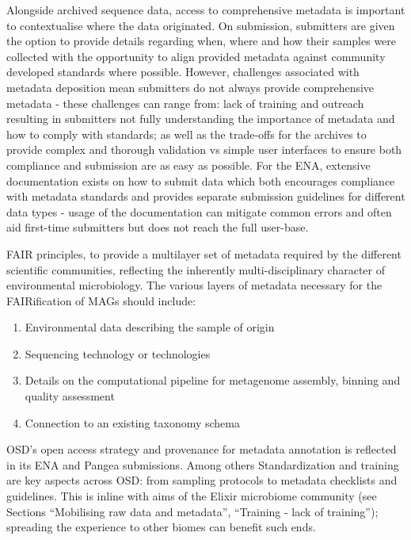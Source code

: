    Alongside archived sequence data, access to comprehensive metadata is important to contextualise where the data originated. 
   On submission, submitters are given the option to provide details regarding when, where and how their samples were collected with the opportunity to align provided metadata against community developed standards where possible. 
   However, challenges associated with metadata deposition mean submitters do not always provide comprehensive metadata - these challenges can range from: 
   lack of training and outreach resulting in submitters not fully understanding the importance of metadata and how to comply with standards; 
   as well as the trade-offs for the archives to provide complex and thorough validation vs simple user interfaces to ensure both compliance and submission are as easy as possible. 
   For the ENA, extensive documentation exists on how to submit data which both encourages compliance with metadata standards and provides separate submission guidelines for different data types - usage of the documentation can mitigate common errors and often aid first-time submitters but does not reach the full user-base. 

   FAIR principles, to provide a multilayer set of metadata required by the different scientific communities, reflecting the inherently multi-disciplinary character of environmental microbiology. 
   The various layers of metadata necessary for the FAIRification of MAGs should include:
   \begin{enumerate}
      \item Environmental data describing the sample of origin
      \item Sequencing technology or technologies
      \item Details on the computational pipeline for metagenome assembly, binning and quality assessment
      \item Connection to an existing taxonomy schema
   \end{enumerate}



   OSD’s open access strategy and provenance for metadata annotation is reflected in its ENA and Pangea submissions. 
   Among others Standardization and training are key aspects across OSD: from sampling protocols to metadata checklists and guidelines. 
   This is inline with aims of the Elixir microbiome community (see Sections “Mobilising raw data and metadata”, “Training - lack of training”); 
   spreading the experience to other biomes can benefit such ends.


